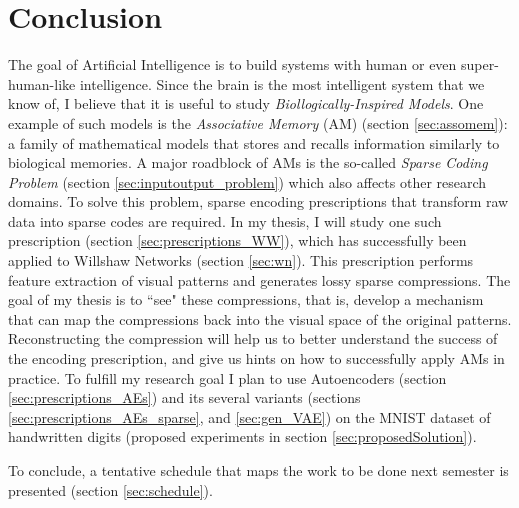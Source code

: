 \documentclass[runningheads]{llncs}
\begin{document}
\section{Conclusion}
\label{sec:conclusion}
The goal of Artificial Intelligence is to build systems with human or even super-human-like intelligence. Since the brain is the most intelligent system that we know of, I believe that it is useful to study \textit{Biollogically-Inspired Models}. One example of such models is the \textit{Associative Memory} (AM) (section \ref{sec:assomem}): a family of mathematical models that stores and recalls information similarly to biological memories. A major roadblock of AMs is the so-called \textit{Sparse Coding Problem} (section \ref{sec:inputoutput_problem}) which also affects other research domains. To solve this problem, sparse encoding prescriptions that transform raw data into sparse codes are required.
In my thesis, I will study one such prescription (section \ref{sec:prescriptions_WW}), which has successfully been applied to Willshaw Networks (section \ref{sec:wn}). This prescription performs feature extraction of visual patterns and generates lossy sparse compressions. The goal of my thesis is to ``see" these compressions, that is, develop a mechanism that can map the compressions back into the visual space of the original patterns. Reconstructing the compression will help us to better understand the success of the encoding prescription, and give us hints on how to successfully apply AMs in practice.
To fulfill my research goal I plan to use Autoencoders (section \ref{sec:prescriptions_AEs}) and its several variants (sections \ref{sec:prescriptions_AEs_sparse}, and \ref{sec:gen_VAE}) on the MNIST dataset of handwritten digits (proposed experiments in section \ref{sec:proposedSolution}).

To conclude, a tentative schedule that maps the work to be done next semester is presented (section \ref{sec:schedule}).




\end{document}
